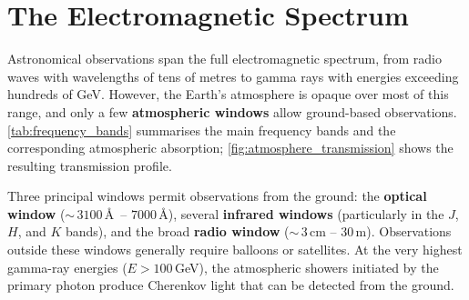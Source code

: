 \section{The Electromagnetic Spectrum} \label{sec:em_spectrum}

Astronomical observations span the full electromagnetic spectrum, from radio waves with wavelengths of tens of metres to gamma rays with energies exceeding hundreds of GeV. However, the Earth's atmosphere is opaque over most of this range, and only a few \textbf{atmospheric windows} allow ground-based observations. \cref{tab:frequency_bands} summarises the main frequency bands and the corresponding atmospheric absorption; \cref{fig:atmosphere_transmission} shows the resulting transmission profile.

\medskip

Three principal windows permit observations from the ground: the \textbf{optical window} (${\sim}\,3100$\,\AA\ -- $7000$\,\AA), several \textbf{infrared windows} (particularly in the $J$, $H$, and $K$ bands), and the broad \textbf{radio window} (${\sim}\,3$\,cm -- $30$\,m). Observations outside these windows generally require balloons or satellites. At the very highest gamma-ray energies ($E > 100$\,GeV), the atmospheric showers initiated by the primary photon produce Cherenkov light that can be detected from the ground.

